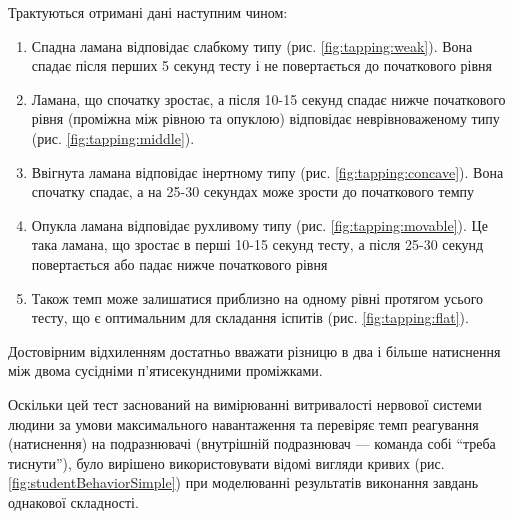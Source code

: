 Трактуються отримані дані наступним чином:
\begin{enumerate}
  \item Спадна ламана відповідає слабкому типу (рис. \ref{fig:tapping:weak}).
    Вона спадає після перших 5 секунд тесту і не повертається до початкового
    рівня
  \item Ламана, що спочатку зростає, а після 10-15 секунд спадає нижче
    початкового рівня (проміжна між рівною та опуклою) відповідає
    неврівноваженому типу (рис. \ref{fig:tapping:middle}).
  \item Ввігнута ламана відповідає інертному типу
    (рис. \ref{fig:tapping:concave}).
    Вона спочатку спадає, а на 25-30 секундах може зрости до початкового темпу
  \item Опукла ламана відповідає рухливому типу
    (рис. \ref{fig:tapping:movable}).
    Це така ламана, що зростає в перші 10-15 секунд тесту, а після 25-30
    секунд повертається або падає нижче початкового рівня
  \item Також темп може залишатися приблизно на одному рівні протягом
    усього тесту, що є оптимальним для складання іспитів
    (рис. \ref{fig:tapping:flat}).
\end{enumerate}

Достовірним відхиленням достатньо вважати різницю в два і більше натиснення між
двома сусідніми п’ятисекундними проміжками. \cite{Ilin:2001}

Оскільки цей тест заснований на вимірюванні витривалості нервової системи людини
за умови максимального навантаження та перевіряє темп реагування (натиснення) на
подразнювачі (внутрішній подразнювач --- команда собі ``треба тиснути''),
було вирішено використовувати відомі вигляди кривих
(рис. \ref{fig:studentBehaviorSimple}) при моделюванні результатів
виконання завдань однакової складності.


